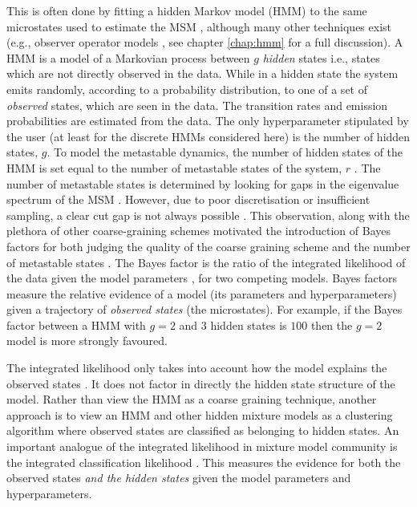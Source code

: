 This is often done by fitting a hidden Markov model (HMM) to the same microstates used to estimate the MSM \cite{noeMarkovModelsMolecular2019b}, although many other techniques exist (e.g., observer operator models \cite{wuProjectedMetastableMarkov2015}, see chapter \ref{chap:hmm} for a full discussion). A HMM is a model of a Markovian process between $g$ \emph{hidden} states i.e., states which are not directly observed in the data. While in a hidden state the system emits randomly, according to a probability distribution, to one of a set of \emph{observed} states, which are seen in the data. The transition rates and emission probabilities are estimated from the data.  The only hyperparameter stipulated by the user (at least for the discrete HMMs considered here) is the number of hidden states, $g$. To model the metastable dynamics, the number of hidden states of the HMM is set equal to the number of metastable states of the system, $r$ \cite{noeProjectedHiddenMarkov2013a}. The number of metastable states is determined by looking for gaps in the eigenvalue spectrum of the MSM \cite{prinzMarkovModelsMolecular2011,noeProjectedHiddenMarkov2013a}. However, due to poor discretisation or insufficient sampling, a clear cut gap is not always possible \cite{bowmanQuantitativeComparisonAlternative2013}. This observation, along with the plethora of other coarse-graining schemes motivated the introduction of Bayes factors \cite{kassBayesFactors1995} for both judging the quality of the coarse graining scheme and the number of metastable states \cite{bacalladoBayesianComparisonMarkov2009a}. The Bayes factor is the ratio of the integrated likelihood of the data given the model parameters \cite{kassBayesFactors1995}, for two competing models. Bayes factors measure the relative evidence of a model (its parameters and hyperparameters) given a trajectory of \emph{observed states} (the microstates). For example, if the Bayes factor between a HMM with $g=2$ and  $3$ hidden states is $100$ then the $g=2$ model is more strongly favoured. 

The integrated likelihood only takes into account how the model explains the observed states \cite{biernackiAssessingMixtureModel2000a,mclachlanFiniteMixtureModels2000}. It does not factor in directly the hidden state structure of the model. Rather than view the HMM as a coarse graining technique, another approach is to view an HMM and other hidden mixture models as a clustering algorithm \cite{mclachlanFiniteMixtureModels2000} where observed states are classified as belonging to hidden states. An important analogue of the integrated likelihood in mixture model community is the integrated classification likelihood \cite{mclachlanFiniteMixtureModels2000}. This measures the evidence for  both the observed states \emph{and the hidden states} given the model parameters and hyperparameters. 

